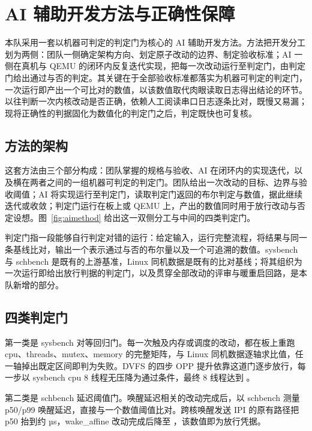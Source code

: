 \section{AI 辅助开发方法与正确性保障}

本队采用一套以机器可判定的判定门为核心的 AI 辅助开发方法。方法把开发分工划为两侧：团队一侧确定架构方向、划定原子改动的边界、制定验收标准；AI 一侧在真机与 QEMU 的闭环内反复迭代实现，把每一次改动运行至判定门，由判定门给出通过与否的判定。其关键在于全部验收标准都落实为机器可判定的判定门，一次运行即产出一个可比对的数值，以该数值取代肉眼读取日志得出结论的环节。以往判断一次内核改动是否正确，依赖人工阅读串口日志逐条比对，既慢又易漏；现将正确性的判据固化为数值化的判定门之后，判定既快也可复核。

\subsection{方法的架构}

这套方法由三个部分构成：团队掌握的规格与验收、AI 在闭环内的实现迭代，以及横在两者之间的一组机器可判定的判定门。团队给出一次改动的目标、边界与验收阈值；AI 将实现运行至判定门，读取判定门返回的布尔判定与数值，据此继续迭代或收敛；判定门运行在板上或 QEMU 上，产出的数值同时用于放行改动与否定设想。图~\ref{fig:aimethod} 给出这一双侧分工与中间的四类判定门。


判定门指一段能够自行判定对错的运行：给定输入，运行完整流程，将结果与同一条基线比对，输出一个表示通过与否的布尔量以及一个可追溯的数值。sysbench 与 schbench 是既有的上游基准，Linux 同机数据是既有的比对基线；将其组织为一次运行即给出放行判据的判定门，以及贯穿全部改动的评审与暖重启回路，是本队新增的部分。

\subsection{四类判定门}

第一类是 sysbench 对等回归门。每一次触及内存或调度的改动，都在板上重跑 cpu、threads、mutex、memory 的完整矩阵，与 Linux 同机数据逐轴求比值，任一轴掉出既定区间即判为失败。DVFS 的四步 OPP 提升依靠这道门逐步放行，每一步以 sysbench cpu 8 线程无压降为通过条件，最终 8 线程达到 。

第二类是 schbench 延迟阈值门。唤醒延迟相关的改动完成后，以 schbench 测量 p50/p99 唤醒延迟，直接与一个数值阈值比对。跨核唤醒发送 IPI 的原有路径把 p50 抬到约 \nWakeBefore{} µs，wake\_affine 改动完成后降至 ，该数值即为放行凭据。

